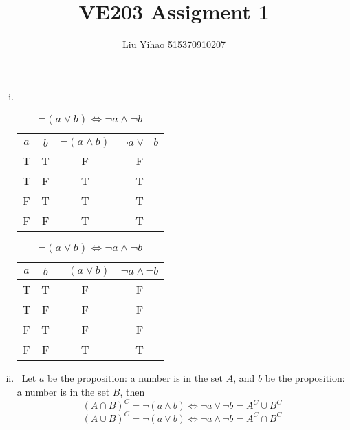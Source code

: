 \documentclass{article}
\title{VE203 Assigment 1}
\author{Liu Yihao 515370910207}
\date{}
\begin{document}
\maketitle

\section{}
\begin{enumerate}[i)]
\item \ 
\begin{table}[!h]
\centering
\begin{minipage}{0.3\textwidth}
\begin{center}
\begin{tabular}{cccc}
\hline
$a$ & $b$ & $\lnot(a\land b)$ & $\lnot a\lor\lnot b$\\
\hline
T & T & F & F \\
T & F & T & T \\
F & T & T & T \\
F & F & T & T \\
\hline
\end{tabular}
\end{center}
\caption*{$\lnot(a\land b)\Leftrightarrow\lnot a\lor\lnot b$}
\end{minipage}
\hfil
\begin{minipage}{0.3\textwidth}
\begin{center}
\begin{tabular}{cccc}
\hline
$a$ & $b$ & $\lnot(a\lor b)$ & $\lnot a\land\lnot b$\\
\hline
T & T & F & F \\
T & F & F & F \\
F & T & F & F \\
F & F & T & T \\
\hline
\end{tabular}
\end{center}
\caption*{$\lnot(a\lor b)\Leftrightarrow\lnot a\land\lnot b$}
\end{minipage}

\end{table}

\item \ 
Let $a$ be the proposition: a number is in the set $A$, and $b$ be the proposition: a number is in the set $B$, then
$$(A\cap B)^C=\lnot(a\land b)\Leftrightarrow\lnot a\lor\lnot b=A^C\cup B^C$$
$$(A\cup B)^C=\lnot(a\lor b)\Leftrightarrow\lnot a\land\lnot b=A^C\cap B^C$$

\end{enumerate}
\end{document}
